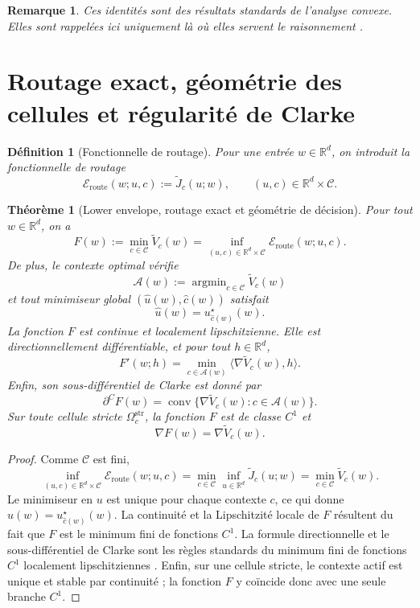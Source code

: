 \documentclass[11pt,a4paper]{article}
\newtheorem{definition}{Définition}[section]
\newtheorem{theorem}{Théorème}[section]
\newtheorem{remark}{Remarque}[section]
\DeclareMathOperator{\argmin}{argmin}
\DeclareMathOperator{\conv}{conv}
\newcommand{\R}{\mathbb R}
\newcommand{\Ccal}{\mathcal C}
\newcommand{\Acal}{\mathcal A}
\begin{document}
\begin{remark}
Ces identités sont des résultats standards de l'analyse convexe. Elles sont rappelées ici uniquement là où elles servent le raisonnement \cite{Moreau1965,Rockafellar1970,BauschkeCombettes2017,RockafellarWets1998}.
\end{remark}

\section{Routage exact, géométrie des cellules et régularité de Clarke}

\begin{definition}[Fonctionnelle de routage]
Pour une entrée \(w\in\R^d\), on introduit la fonctionnelle de routage
\[
\mathcal E_{\mathrm{route}}(w;u,c):=\widetilde J_c(u;w),
\qquad
(u,c)\in \R^d\times\Ccal.
\]
\end{definition}

\begin{theorem}[Lower envelope, routage exact et géométrie de décision]
Pour tout \(w\in\R^d\), on a
\[
F(w):=\min_{c\in\Ccal}\widetilde V_c(w)
=
\inf_{(u,c)\in \R^d\times\Ccal}\mathcal E_{\mathrm{route}}(w;u,c).
\]
De plus, le contexte optimal vérifie
\[
\Acal(w):=\argmin_{c\in\Ccal}\widetilde V_c(w)
\]
et tout minimiseur global \((\hat u(w),\hat c(w))\) satisfait
\[
\hat u(w)=u_{\hat c(w)}^\star(w).
\]
La fonction \(F\) est continue et localement lipschitzienne. Elle est directionnellement différentiable, et pour tout \(h\in\R^d\),
\[
F'(w;h)=\min_{c\in\Acal(w)}\langle \nabla \widetilde V_c(w),h\rangle.
\]
Enfin, son sous-différentiel de Clarke est donné par
\[
\partial^C F(w)=\conv\{\nabla \widetilde V_c(w): c\in\Acal(w)\}.
\]
Sur toute cellule stricte \(\Omega_c^{\mathrm{str}}\), la fonction \(F\) est de classe \(C^1\) et
\[
\nabla F(w)=\nabla \widetilde V_c(w).
\]
\end{theorem}

\begin{proof}
Comme \(\Ccal\) est fini,
\[
\inf_{(u,c)\in \R^d\times\Ccal}\mathcal E_{\mathrm{route}}(w;u,c)
=
\min_{c\in\Ccal}\inf_{u\in\R^d}\widetilde J_c(u;w)
=
\min_{c\in\Ccal}\widetilde V_c(w).
\]
Le minimiseur en \(u\) est unique pour chaque contexte \(c\), ce qui donne \(\hat u(w)=u_{\hat c(w)}^\star(w)\). La continuité et la Lipschitzité locale de \(F\) résultent du fait que \(F\) est le minimum fini de fonctions \(C^1\). La formule directionnelle et le sous-différentiel de Clarke sont les règles standards du minimum fini de fonctions \(C^1\) localement lipschitziennes \cite{Clarke1983}. Enfin, sur une cellule stricte, le contexte actif est unique et stable par continuité ; la fonction \(F\) y coïncide donc avec une seule branche \(C^1\).
\end{proof}
\end{document}
